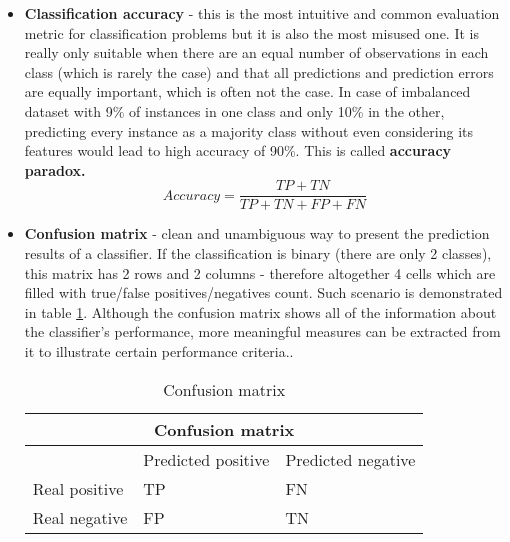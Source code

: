 \begin{itemize}
\item \textbf{Classification accuracy} - this is the most intuitive and common evaluation metric for classification problems but it is also the most misused one. It is really only suitable when there are an equal number of observations in each class (which is rarely the case) and that all predictions and prediction errors are equally important, which is often not the case. In case of imbalanced dataset with 9\% of instances in one class and only 10\% in the other, predicting every instance as a majority class without even considering its features would lead to high accuracy of 90\%. This is called \textbf{accuracy paradox.}
\[ Accuracy = \frac{TP + TN}{TP + TN + FP + FN}\]
\item \textbf{Confusion matrix} - clean and unambiguous way to present the prediction results of a classifier. If the classification is binary (there are only 2 classes), this matrix has 2 rows and 2 columns - therefore altogether 4 cells which are filled with true/false positives/negatives count. Such scenario is demonstrated in table \ref{table:Confusion_matrix_general}. Although the confusion matrix shows all of the information about the classifier's performance, more meaningful measures can be extracted from it to illustrate certain performance criteria.\cite{bradley1997use}. 
\begin{table}[H]
{
\centering
\begin{tabular}{ |p{4cm}|p{4cm}|p{4cm}|  }
 \hline
 \multicolumn{3}{|c|}{Confusion matrix} \\
 \hline
  & Predicted positive & Predicted negative\\
 \hline
 Real positive   & TP    &FN\\ \hline
 Real negative &   FP  & TN\\ \hline
\end{tabular}
}
\caption{Confusion matrix}
\label{table:Confusion_matrix_general}
\end{table}


\end{itemize}

